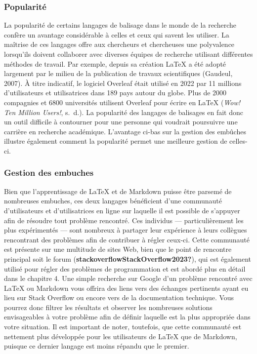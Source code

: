 \documentclass[
  letterpaper,
  DIV=11,
  numbers=noendperiod]{scrreprt}
\begin{document}
\subsubsection{Popularité}\label{popularituxe9}

La popularité de certains langages de balisage dans le monde de la
recherche confère un avantage considérable à celles et ceux qui savent
les utiliser. La maîtrise de ces langages offre aux chercheurs et
chercheuses une polyvalence lorsqu'ils doivent collaborer avec diverses
équipes de recherche utilisant différentes méthodes de travail. Par
exemple, depuis sa création LaTeX a été adopté largement par le milieu
de la publication de travaux scientifiques (Gaudeul, 2007). À titre
indicatif, le logiciel Overleaf était utilisé en 2022 par 11 millions
d'utilisateurs et utilisatrices dans 189 pays autour du globe. Plus de
2000 compagnies et 6800 universités utilisent Overleaf pour écrire en
LaTeX (\emph{Wow! {Ten} Million Users!}, s.~d.). La popularité des
langages de balisages en fait donc un outil difficile à contourner pour
une personne qui voudrait poursuivre une carrière en recherche
académique. L'avantage ci-bas sur la gestion des embûches illustre
également comment la popularité permet une meilleure gestion de
celles-ci.

\subsubsection{Gestion des embuches}\label{gestion-des-embuches}

Bien que l'apprentissage de LaTeX et de Markdown puisse être parsemé de
nombreuses embuches, ces deux langages bénéficient d'une communauté
d'utilisateurs et d'utilisatrices en ligne sur laquelle il est possible
de s'appuyer afin de résoudre tout problème rencontré. Ces individus ---
particulièrement les plus expérimentés --- sont nombreux à partager leur
expérience à leurs collègues rencontrant des problèmes afin de
contribuer à régler ceux-ci. Cette communauté est présente sur une
multitude de sites Web, bien que le point de rencontre principal soit le
forum (\textbf{stackoverflowStackOverflow2023?}), qui est également
utilisé pour régler des problèmes de programmation et est abordé plus en
détail dans le chapitre 4. Une simple recherche sur Google d'un problème
rencontré avec LaTeX ou Markdown vous offrira des liens vers des
échanges pertinents ayant eu lieu sur Stack Overflow ou encore vers de
la documentation technique. Vous pourrez donc filtrer les résultats et
observer les nombreuses solutions envisageables à votre problème afin de
définir laquelle est la plus appropriée dans votre situation. Il est
important de noter, toutefois, que cette communauté est nettement plus
développée pour les utilisateurs de LaTeX que de Markdown, puisque ce
dernier langage est moins répandu que le premier.
\end{document}
